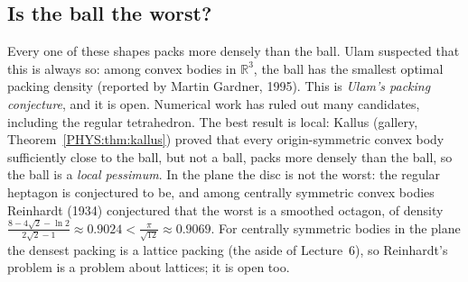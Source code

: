 \documentclass[11pt,openany]{book}
\theoremstyle{plain}
\theoremstyle{definition}
\theoremstyle{remark}
\newcommand{\R}{\mathbb{R}}
\begin{document}
\subsection*{Is the ball the worst?}
Every one of these shapes packs more densely than the ball. Ulam suspected that this is always so: among
convex bodies in $\R^3$, the ball has the smallest optimal packing density (reported by Martin Gardner,
1995). This is \emph{Ulam's packing conjecture}, and it is open. Numerical work has ruled out many
candidates, including the regular tetrahedron. The best result is local: Kallus (gallery,
Theorem~\ref{PHYS:thm:kallus}) proved that every origin-symmetric convex body sufficiently close to the
ball, but not a ball, packs more densely than the ball, so the ball is a \emph{local pessimum}. In the plane
the disc is not the worst: the regular heptagon is conjectured to be, and among centrally symmetric convex
bodies Reinhardt (1934) conjectured that the worst is a smoothed octagon, of density
$\frac{8-4\sqrt2-\ln2}{2\sqrt2-1}\approx0.9024<\frac{\pi}{\sqrt{12}}\approx0.9069$. For centrally symmetric
bodies in the plane the densest packing is a lattice packing (the aside of Lecture~6), so Reinhardt's
problem is a problem about lattices; it is open too.
\end{document}
